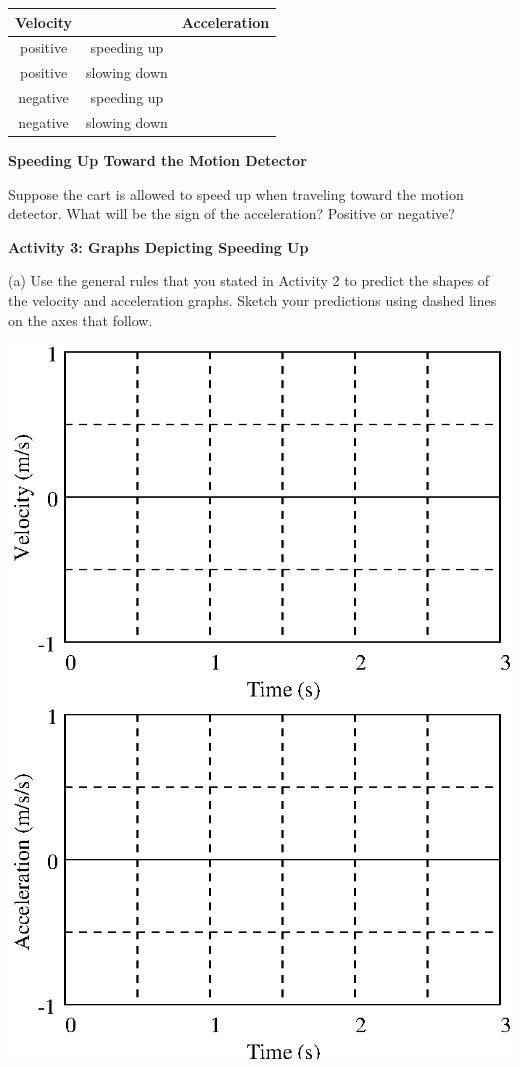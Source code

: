 \vspace{0.3cm}
{\centering \begin{tabular}{|c|c|c|}
\hline
Velocity&
&
Acceleration\\
\hline
positive&
speeding up&
\\
\hline
positive&
slowing down&
\\
\hline
negative&
speeding up&
\\
\hline
negative&
slowing down&
\\
\hline
\end{tabular}\par}
\vspace{0.3cm}

\pagebreak[3]
\textbf{Speeding Up Toward the Motion Detector} 

Suppose the cart is allowed to speed up when traveling toward the motion 
detector. What will be the sign of the acceleration? Positive or negative? 

\textbf{Activity 3: Graphs Depicting Speeding Up} 

(a) Use the general rules that you stated in Activity 2 to predict the shapes
of the velocity and acceleration graphs. Sketch your predictions using dashed
lines on the axes that follow.

\vspace{0.3cm}
{\par\centering \includegraphics{slowing/slowing_fig1.eps} \par}
\vspace{0.3cm}

